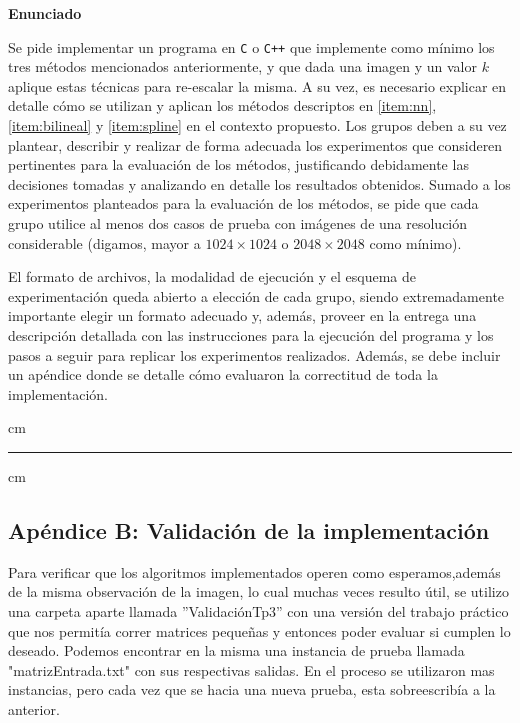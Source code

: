\documentclass[a4paper]{article}
\begin{document}
\vskip 5pt

{\bf\noindent Enunciado}

Se pide implementar un programa en \verb-C- o \verb-C++- que implemente como m\'inimo los tres m\'etodos mencionados anteriormente, y que dada una imagen y un valor $k$ aplique estas t\'ecnicas para re-escalar la misma. A su vez, es necesario explicar en detalle c\'omo se utilizan y aplican los m\'etodos descriptos en \ref{item:nn}, \ref{item:bilineal} y \ref{item:spline} en el contexto propuesto. Los grupos deben a su vez plantear, describir y realizar de forma adecuada los experimentos que consideren pertinentes para la evaluaci\'on de los m\'etodos, justificando debidamente las decisiones tomadas y analizando en detalle los resultados obtenidos. Sumado a los experimentos planteados para la evaluaci\'on de los m\'etodos, se pide que cada grupo utilice al menos dos casos de prueba con im\'agenes de una resoluci\'on considerable (digamos, mayor a $1024\times 1024$ o $2048\times 2048$ como m\'inimo).

El formato de archivos, la modalidad de ejecuci\'on y el esquema de experimentaci\'on queda abierto a elecci\'on de cada grupo, siendo extremadamente importante elegir un formato adecuado y, adem\'as, proveer en la entrega una descripci\'on detallada con las instrucciones para la ejecuci\'on del programa y los pasos a seguir para replicar los experimentos realizados. Adem\'as, se debe incluir un ap\'endice donde se detalle c\'omo evaluaron la correctitud de toda la implementaci\'on.

 cm
\hrule
{} cm


\subsection*{Apéndice B: Validación de la implementación}

Para verificar que los algoritmos implementados operen como esperamos,además de la misma observación de la imagen, lo cual muchas veces resulto útil, se utilizo una carpeta aparte llamada ''ValidaciónTp3'' con una versión del trabajo práctico que nos permitía correr matrices pequeñas y entonces poder evaluar si cumplen lo deseado. Podemos encontrar en la misma una instancia de prueba llamada "matrizEntrada.txt" con sus respectivas salidas. En el proceso se utilizaron mas instancias, pero cada vez que se hacia una nueva prueba, esta sobreescribía a la anterior.
\end{document}

